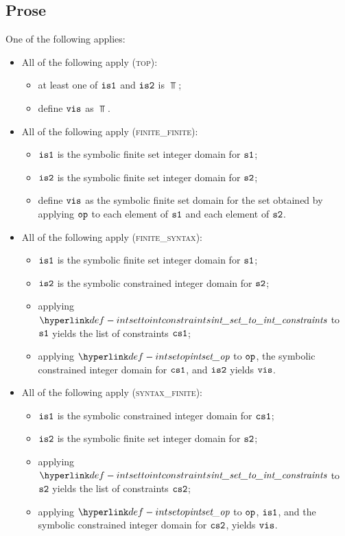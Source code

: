 \subsection{Prose}
One of the following applies:
\begin{itemize}
  \item All of the following apply (\textsc{top}):
  \begin{itemize}
    \item at least one of $\texttt{is1}$ and $\texttt{is2}$ is $\Top$;
    \item define $\texttt{vis}$ as $\Top$.
  \end{itemize}

  \item All of the following apply (\textsc{finite\_finite}):
  \begin{itemize}
    \item $\texttt{is1}$ is the symbolic finite set integer domain for $\texttt{s1}$;
    \item $\texttt{is2}$ is the symbolic finite set integer domain for $\texttt{s2}$;
    \item define $\texttt{vis}$ as the symbolic finite set domain for the set obtained
          by applying $\texttt{op}$ to each element of $\texttt{s1}$ and each element of $\texttt{s2}$.
  \end{itemize}

  \item All of the following apply (\textsc{finite\_syntax}):
  \begin{itemize}
    \item $\texttt{is1}$ is the symbolic finite set integer domain for $\texttt{s1}$;
    \item $\texttt{is2}$ is the symbolic constrained integer domain for $\texttt{s2}$;
    \item applying $\intsettointconstraints$ to $\texttt{s1}$ yields the list of constraints $\texttt{cs1}$;
    \item applying $\intsetop$ to $\texttt{op}$, the symbolic constrained integer domain for $\texttt{cs1}$,
          and $\texttt{is2}$ yields $\texttt{vis}$.
  \end{itemize}

  \item All of the following apply (\textsc{syntax\_finite}):
  \begin{itemize}
    \item $\texttt{is1}$ is the symbolic constrained integer domain for $\texttt{cs1}$;
    \item $\texttt{is2}$ is the symbolic finite set integer domain for $\texttt{s2}$;
    \item applying $\intsettointconstraints$ to $\texttt{s2}$ yields the list of constraints $\texttt{cs2}$;
    \item applying $\intsetop$ to $\texttt{op}$, $\texttt{is1}$, and the symbolic constrained integer domain
          for $\texttt{cs2}$, yields $\texttt{vis}$.
  \end{itemize}


\end{itemize}
